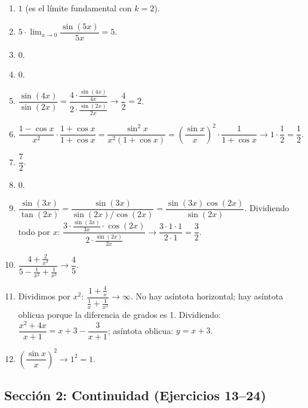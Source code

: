 \documentclass[12pt, letterpaper]{article}
\begin{document}
  \begin{enumerate}[series=respuestas, leftmargin=*, label=\textbf{\arabic*.}]
    \item $1$ (es el límite fundamental con $k = 2$).

    \item $5 \cdot \lim_{x \to 0} \dfrac{\sin(5x)}{5x} = 5$.

    \item $0$.

    \item $0$.

    \item $\dfrac{\sin(4x)}{\sin(2x)} = \dfrac{4 \cdot \frac{\sin(4x)}{4x}}{2 \cdot \frac{\sin(2x)}{2x}} \to \dfrac{4}{2} = 2$.

    \item $\dfrac{1 - \cos x}{x^2} \cdot \dfrac{1 + \cos x}{1 + \cos x} = \dfrac{\sin^2 x}{x^2(1 + \cos x)} = \left(\dfrac{\sin x}{x}\right)^2 \cdot \dfrac{1}{1 + \cos x} \to 1 \cdot \dfrac{1}{2} = \dfrac{1}{2}$.

    \item $\dfrac{7}{2}$.

    \item $0$.

    \item $\dfrac{\sin(3x)}{\tan(2x)} = \dfrac{\sin(3x)}{\sin(2x)/\cos(2x)} = \dfrac{\sin(3x) \cos(2x)}{\sin(2x)}$. Dividiendo todo por $x$: $\dfrac{3 \cdot \frac{\sin(3x)}{3x} \cdot \cos(2x)}{2 \cdot \frac{\sin(2x)}{2x}} \to \dfrac{3 \cdot 1 \cdot 1}{2 \cdot 1} = \dfrac{3}{2}$.

    \item $\dfrac{4 + \frac{2}{x^3}}{5 - \frac{1}{x^2} + \frac{1}{x^3}} \to \dfrac{4}{5}$.

    \item Dividimos por $x^2$: $\dfrac{1 + \frac{4}{x}}{\frac{1}{x} + \frac{1}{x^2}} \to \infty$. No hay asíntota horizontal; hay asíntota oblicua porque la diferencia de grados es 1. Dividiendo: $\dfrac{x^2 + 4x}{x + 1} = x + 3 - \dfrac{3}{x + 1}$; asíntota oblicua: $y = x + 3$.

    \item $\left(\dfrac{\sin x}{x}\right)^2 \to 1^2 = 1$.
  \end{enumerate}


  \subsection*{Sección 2: Continuidad (Ejercicios 13--24)}
\end{document}
